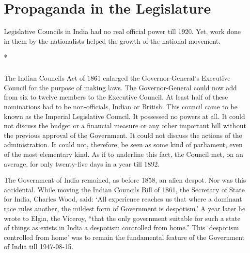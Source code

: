 \chapter{Propaganda in the Legislature}

Legislative Councils in India had no real official power till 1920. Yet, work done in them by the nationalists helped the growth of the national movement.

\begin{center}*\end{center}

\paragraph*{}
The Indian Councils Act of 1861 enlarged the Governor-General's Executive Council for the purpose of making laws. The Governor-General could now add from six to twelve members to the Executive Council. At least half of these nominations had to be non-officials, Indian or British. This council came to be known as the Imperial Legislative Council. It possessed no powers at all. It could not discuss the budget or a financial measure or any other important bill without the previous approval of the Government. It could not discuss the actions of the administration. It could not, therefore, be seen as some kind of parliament, even of the most elementary kind. As if to underline this fact, the Council met, on an average, for only twenty-five days in a year till 1892.

The Government of India remained, as before 1858, an alien despot. Nor was this accidental. While moving the Indian Councils Bill of 1861, the Secretary of State for India, Charles Wood, said: `All experience reaches us that where a dominant race rules another, the mildest form of Government is despotism.' A year later he wrote to Elgin, the Viceroy, ``that the only government suitable for such a state of things as exists in India a despotism controlled from home.'' This `despotism controlled from home' was to remain the fundamental feature of the Government of India till 1947-08-15.

